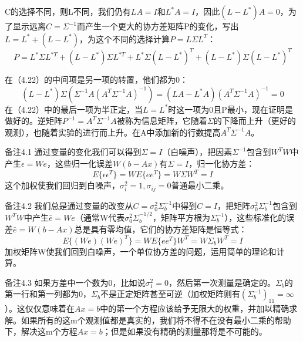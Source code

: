 	C的选择不同，则L不同，我们仍有$LA=I$和$L^*A=I$，因此$(L-L^*)A=0$，为了显示远离$C=\Sigma^{-1}$而产生一个更大的协方差矩阵P的变化，写出$L=L^*+(L-L^*)$，为这个不同的选择计算$P=L\Sigma L^T$：
	\begin{equation}
	P=L^*\Sigma L^{*T} + (L-L^*)\Sigma L^{*T} + L^*\Sigma(L-L^*)^T + (L-L^*)\Sigma(L-L^*)^T
	\end{equation}
	
	在（4.22）的中间项是另一项的转置，他们都为0：
	\begin{equation}
	(L-L^*)\Sigma(\Sigma^{-1}A(A^T\Sigma^{-1}A)^{-1})=(LA-L^*A)(A^T\Sigma^{-1}A)^{-1}=0
	\end{equation}
	在（4.22）中的最后一项为半正定，当$L=L^*$时这一项为0且P最小，现在证明是做好的。逆矩阵$P^{-1}=A^T\Sigma^{-1}A$被称为信息矩阵，它随着$\Sigma$的下降而上升（更好的观测），也随着实验的进行而上升。在A中添加新的行数提高$A^T\Sigma^{-1}A$。
	
	备注4.1 \quad  通过变量的变化我们可以得到$\Sigma=I$（白噪声），把因素$\Sigma^{-1}$包含到$W^TW$中产生$\epsilon=We$，这些归一化误差$W(b-Ax)$有$\Sigma=I$，归一化协方差：
	\begin{equation*}
	E\{\epsilon\epsilon^T\}=WE\{ee^T\}=W\Sigma W^T=I
	\end{equation*}
	这个加权使我们回归到白噪声，$\sigma^2_i=1,\sigma_{ij}=0$普通最小二乘。
	
	备注4.2 \quad   我们总是通过变量的改变从$C=\sigma^2_0\Sigma^{-1}_b$中得到$C=I$，把矩阵$\sigma^2_0\Sigma^{-1}_b$包含到$W^TW$中产生$\bar{e}=We$（通常W代表$\sigma^2_0\Sigma^{-1/2}_b$，矩阵平方根为$\Sigma^{-1}_b$），这些标准化的误差$\bar{e}=W(b-Ax)$总是具有零均值，它们的协方差矩阵是恒等式：
	\begin{equation*}
	E\{(We)(We)^T\}=WE\{ee^T\}W^T=W\Sigma_bW^T=I
	\end{equation*}
	加权矩阵W使我们回到白噪声，一个单位协方差的问题，运用简单的理论和计算。
	
	备注4.3  \quad 如果方差中一个数为0，比如说$\sigma^2_1=0$，然后第一次测量是确定的。$\Sigma_b$的第一行和第一列都为0，$\Sigma_b$不是正定矩阵甚至可逆（加权矩阵则有$(\Sigma^{-1}_b)_{11}=\infty$）。这仅仅意味着在$Ax=b$中的第一个方程应该给予无限大的权重，并加以精确求解。如果所有的这m个观测值都是真实的，我们将不得不在没有最小二乘的帮助下，解决这m个方程$Ax=b$；但是如果没有精确的测量那将是不可能的。